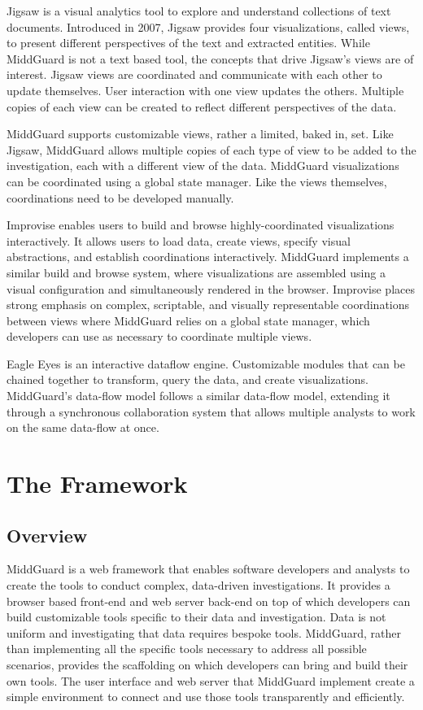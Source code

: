 \documentclass[midd]{thesis}
\begin{document}
Jigsaw \cite{Stasko:2008:JSI:1466620.1466622} is a visual analytics tool to
explore and understand collections of text documents. Introduced in 2007, Jigsaw
provides four visualizations, called views, to present different perspectives of
the text and extracted entities. While MiddGuard is not a text based tool, the
concepts that drive Jigsaw's views are of interest. Jigsaw views are coordinated
and communicate with each other to update themselves. User interaction with one
view updates the others. Multiple copies of each view can be created to reflect
different perspectives of the data.

MiddGuard supports customizable views, rather a limited, baked in, set. Like
Jigsaw, MiddGuard allows multiple copies of each type of view to be added to the
investigation, each with a different view of the data. MiddGuard visualizations
can be coordinated using a global state manager. Like the views themselves,
coordinations need to be developed manually.

Improvise \cite{weaver-2004a} enables users to build and browse
highly-coordinated visualizations interactively. It allows users to load data,
create views, specify visual abstractions, and establish coordinations
interactively. MiddGuard implements a similar build and browse system, where
visualizations are assembled using a visual configuration and simultaneously
rendered in the browser. Improvise places strong emphasis on complex,
scriptable, and visually representable coordinations between views where
MiddGuard relies on a global state manager, which developers can use as
necessary to coordinate multiple views.

Eagle Eyes \cite{7347662} is an interactive dataflow engine. Customizable
modules that can be chained together to transform, query the data, and create
visualizations. MiddGuard's data-flow model follows a similar data-flow model,
extending it through a synchronous collaboration system that allows multiple
analysts to work on the same data-flow at once.

\chapter{The Framework}

\section{Overview}

MiddGuard is a web framework that enables software developers and analysts to
create the tools to conduct complex, data-driven investigations. It provides a
browser based front-end and web server back-end on top of which developers can
build customizable tools specific to their data and investigation. Data is not
uniform and investigating that data requires bespoke tools. MiddGuard,
rather than implementing all the specific tools necessary to address all
possible scenarios, provides the scaffolding on which developers can bring and
build their own tools. The user interface and web server that MiddGuard
implement create a simple environment to connect and use those tools
transparently and efficiently.
\end{document}

